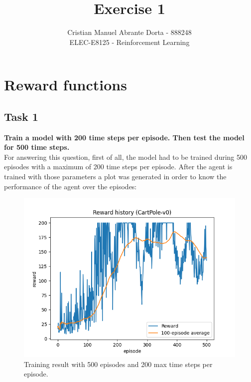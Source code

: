 \documentclass[12pt]{article}
\begin{document}
 
\title{Exercise 1}
\author{Cristian Manuel Abrante Dorta - 888248\\
ELEC-E8125 - Reinforcement Learning}

\maketitle
\section{Reward functions}
\label{sec:reward-functions}

\subsection{Task 1}
\label{sec:task-1}
\textbf {
    Train a model with 200 time steps per episode. Then test the model for 500 time steps.
}\\

For answering this question, first of all, the model had to be trained during 500 episodes with a maximum of 200 time steps per episode. After the agent is trained with those parameters a plot was generated in order to know the performance of the agent over the episodes:

\begin{figure}[ht]
    \centering
    \includegraphics[scale=0.5]{exercise-1/report/img/task-1-training-200.png}
    \caption{Training result with 500 episodes and 200 max time steps per episode.}
    \label{fig:training-200}
\end{figure}
\end{document}
